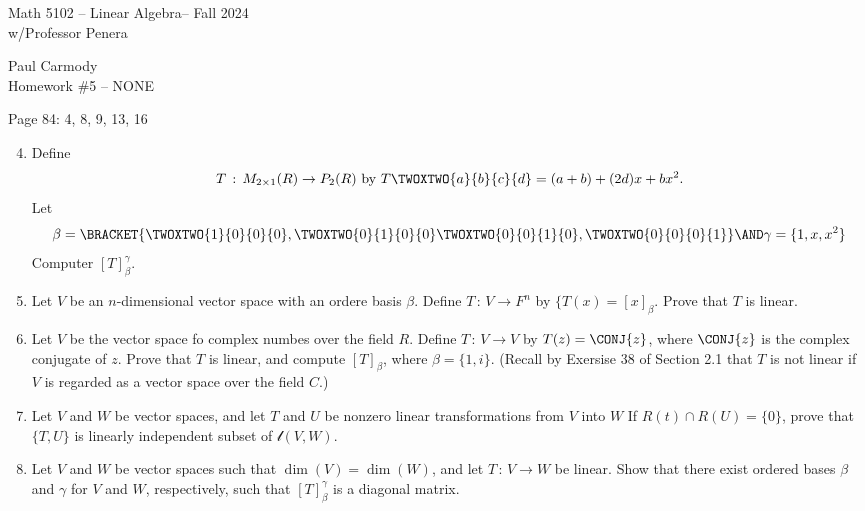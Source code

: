 \documentclass[10pt,a4paper]{report}
\newcommand{\CLASSNAME}{Math 5102 -- Linear Algebra}
\newcommand{\STUDENTNAME}{Paul Carmody}
\newcommand{\ASSIGNMENT}{Homework \#5 }
\newcommand{\DUEDATE}{NONE}
\newcommand{\SEMESTER}{Fall 2024}
\begin{document}
\begin{center}
	\Large{\CLASSNAME -- \SEMESTER} \\
	\large{ w/Professor Penera}
\end{center}
\begin{center}
	\STUDENTNAME \\
	\ASSIGNMENT -- \DUEDATE\\
\end{center} 
Page 84: 4, 8, 9, 13, 16
\begin{enumerate}
	\setcounter{enumi}{3}
	\item Define
	\begin{align*}
		T\,:\, M_{2\times 1}(R)\to P_2(R)\text{ by } T\TWOXTWO{a}{b}{c}{d}=(a+b)+(2d)x+bx^2.
	\end{align*}Let
	\begin{align*}
		\beta =\BRACKET{\TWOXTWO{1}{0}{0}{0}, \TWOXTWO{0}{1}{0}{0}\TWOXTWO{0}{0}{1}{0},\TWOXTWO{0}{0}{0}{1}} \AND \gamma = \{1,x,x^2\}
	\end{align*}Computer $[T]_\beta^\gamma$.
	\setcounter{enumi}{7}
	\item Let $V$ be an $n$-dimensional vector space with an ordere basis $\beta$.  Define $T\,:\,V \to F^n$ by $\{T(x)=[x]_\beta$.  Prove that $T$ is linear.
	\item Let $V$ be the vector space fo complex numbes over the field $R$.  Define $T\,:\,V \to V$ by $T(z)=\CONJ{z}$, where $\CONJ{z}$ is the complex conjugate of $z$.  Prove that $T$ is linear, and compute $[T]_\beta$, where $\beta=\{1,i\}$.  (Recall by Exersise 38 of Section 2.1 that $T$ is not linear if $V$ is regarded as a vector space over the field $C$.)
	\setcounter{enumi}{12}
	\item Let $V$ and $W$ be vector spaces, and let $T$ and $U$ be nonzero linear transformations from $V$ into $W$  If $R(t) \cap R(U) = \{0\}$, prove that $\{T,U\}$ is linearly independent subset of $\mathcal{l}(V,W)$.
	\setcounter{enumi}{15}
	\item Let $V$ and $W$ be vector spaces such that $\dim(V)=\dim (W)$, and let $T\,:\,V \to W$ be linear.  Show that there exist ordered bases $\beta$ and $\gamma$ for $V$ and $W$, respectively, such that $[T]_\beta^\gamma$ is a diagonal matrix.
\end{enumerate}
\end{document}
